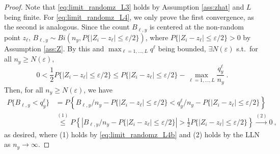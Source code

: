 \documentclass[11pt]{article}
\numberwithin{equation}{section}
\begin{document}
\begin{proof}
  Note that \eqref{eq:limit_randomz_L3} holds by Assumption \ref{ass:zhat} and $L$ being finite. For \eqref{eq:limit_randomz_L4}, we only prove the first convergence, as the second is analogous. Since the count $B_{\ell,y}$ is centered at the non-random point $z_\ell$, $B_{\ell,y}\sim Bi(n_y,P\{|Z_{i}-z_{\ell}|\leq\varepsilon/2\})$, where $P\{|Z_{i}-z_{\ell}|\leq\varepsilon/2\}>0$ by Assumption \ref{ass:Z}. By this and $\max_{\ell=1,\ldots,L}q^{\ell}$ being bounded, $\exists N(\varepsilon)$ s.t.\ for all $n_y\geq N(\varepsilon)$,
  \begin{equation}
  0<\frac{1}{2}P\{|Z_{i}-z_{\ell}|\leq\varepsilon/2\}\leq
  P\{|Z_{i}-z_{\ell}|\leq\varepsilon/2\}-\max_{\ell=1,\ldots,L}\frac{q^{\ell}_y}{n_y}~.
  \label{eq:limit_randomz_L4b}
  \end{equation}
  Then, for all $n_y\geq N(\varepsilon)$, we have
  \begin{align*}
  P\{B_{\ell,y}<q_{y}^{\ell}\}
  &=P\left\{{B_{\ell,y}}/{n_y}-P\{|Z_{i}-z_{\ell}|\leq\varepsilon/2\}
  <{q^{\ell}_y}/{n_y}-P\{|Z_{i}-z_{\ell}|\leq\varepsilon/2\}\right\}\\
  &\overset{(1)}{\leq}P\left\{\left\vert{B_{\ell,y}}/{n_y}
  -P\{|Z_{i}-z_{\ell}|\leq\varepsilon/2\}\right\vert
  >\tfrac{1}{2}P\{|Z_{i}-z_{\ell}|\leq\varepsilon/2\}\right\}
  \overset{(2)}{\rightarrow}0~,
  \end{align*}
  as desired, where (1) holds by \eqref{eq:limit_randomz_L4b} and (2) holds by the LLN as $n_y\to\infty$.


\end{proof}
\end{document}
